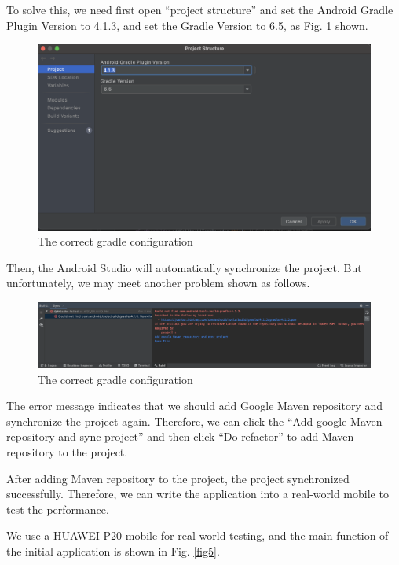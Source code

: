 \documentclass[12pt, a4paper]{article}
\theoremstyle{definition}
\begin{document}
To solve this, we need first open ``project structure'' and set the Android Gradle Plugin Version to 4.1.3, and set the Gradle Version to 6.5, as Fig. \ref{fig3} shown.
\begin{figure}[htbp]
	\centering
	\includegraphics[width=6in]{3.png}
	\caption{The correct gradle configuration}
	\label{fig3}
\end{figure}

Then, the Android Studio will automatically synchronize the project. But unfortunately, we may meet another problem shown as follows.
\begin{figure}[htbp]
	\centering
	\includegraphics[width=7in]{4.png}
	\caption{The correct gradle configuration}
	\label{fig4}
\end{figure}

The error message indicates that we should add Google Maven repository and synchronize the project again. Therefore, we can click the ``Add google Maven repository and sync project'' and then click ``Do refactor'' to add Maven repository to the project.

After adding Maven repository to the project, the project synchronized successfully. Therefore, we can write the application into a real-world mobile to test the performance.

We use a HUAWEI P20 mobile for real-world testing, and the main function of the initial application is shown in Fig. \ref{fig5}.
\end{document}
